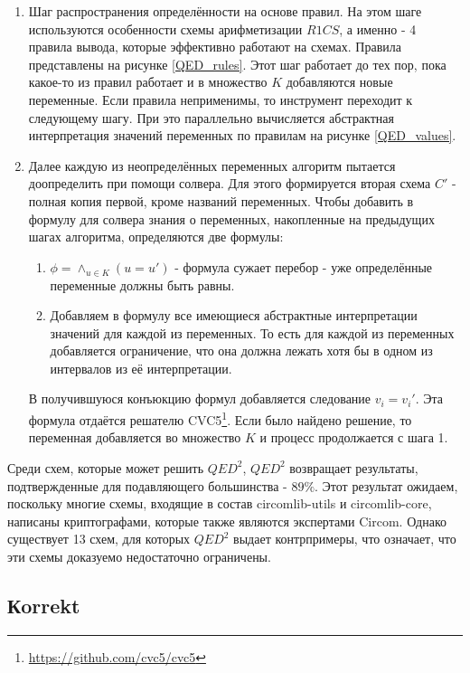 \documentclass[a4paper]{article}
\begin{document}
\begin{enumerate}
    \item Шаг распространения определённости на основе правил. На этом шаге используются особенности схемы арифметизации $R1CS$, а именно - 4 правила вывода, которые эффективно работают на схемах. Правила представлены на рисунке \ref{QED_rules}. Этот шаг работает до тех пор, пока какое-то из правил работает и в множество $K$ добавляются новые переменные. Если правила неприменимы, то инструмент переходит к следующему шагу. При это параллельно вычисляется абстрактная интерпретация значений переменных по правилам на рисунке \ref{QED_values}.
    \item Далее каждую из неопределённых переменных алгоритм пытается доопределить при помощи солвера. Для этого формируется вторая схема $C'$ - полная копия первой, кроме названий переменных. Чтобы добавить в формулу для солвера знания о переменных, накопленные на предыдущих шагах алгоритма, определяются две формулы:
    \begin{enumerate}
        \item $\phi = \land_{u \in K} (u = u')$ - формула сужает перебор - уже определённые переменные должны быть равны.
        \item Добавляем в формулу все имеющиеся абстрактные интерпретации значений для каждой из переменных. То есть для каждой из переменных добавляется ограничение, что она должна лежать хотя бы в одном из интервалов из её интерпретации.
    \end{enumerate}
    В получившуюся конъюкцию формул добавляется следование $v_i = v_i'$. Эта формула отдаётся решателю CVC5\footnote[1]{\href{https://github.com/cvc5/cvc5}{https://github.com/cvc5/cvc5}}. Если было найдено решение, то переменная добавляется во множество $K$ и процесс продолжается с шага 1.
\end{enumerate}


Среди схем, которые может решить $QED^2$, $QED^2$ возвращает результаты, подтвержденные для подавляющего большинства - $89\%$.
Этот результат ожидаем, поскольку многие схемы, входящие в состав circomlib-utils и circomlib-core, написаны криптографами, которые также являются экспертами Circom. Однако существует 13 схем, для
которых $QED^2$ выдает контрпримеры, что означает, что эти схемы доказуемо недостаточно ограничены.

\subsection{Кorrekt}
\end{document}
